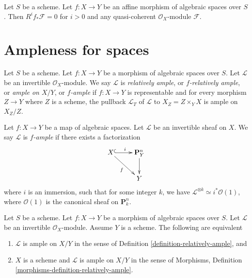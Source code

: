 \begin{lemma}
\label{lemma-affine-vanishing-higher-direct-images}
Let $S$ be a scheme. Let $f : X \to Y$ be an affine
morphism of algebraic spaces over $S$. Then
$R^if_*\mathcal{F} = 0$ for $i > 0$ and any quasi-coherent
$\mathcal{O}_X$-module $\mathcal{F}$.
\end{lemma}

\section{Ampleness for spaces}
\begin{definition}\label{definition-relatively-ample}
Let $S$ be a scheme.
Let $f : X \to Y$ be a morphism of algebraic spaces over $S$.
Let $\mathcal{L}$ be an invertible $\mathcal{O}_X$-module.
We say $\mathcal{L}$ is {\it relatively ample}, or {\it $f$-relatively ample},
or {\it ample on $X/Y$}, or {\it $f$-ample} if $f : X \to Y$
is representable and for every morphism $Z \to Y$
where $Z$ is a scheme, the pullback $\mathcal{L}_T$ of $\mathcal{L}$
to $X_Z = Z \times_Y X$ is ample on $X_Z/Z$.
\end{definition}

\begin{definition}[{\cite[II, Def.\ 7.9]{Kn}}]\label{definition-knutson-ample}
  Let $f : X \to Y$ be a map of algebraic spaces. Let $\mathcal{L}$ be an
  invertible sheaf on $X$. We say $\mathcal{L}$ is {\it $f$-ample} if there
  exists a factorization
  $$
  \xymatrix{
    X \ar@{^{(}->}[r]^i\ar[dr]_f & \mathbf{P}^n_Y \ar[d]\\
    & Y
  }
  $$
  where $i$ is an immersion, such that for some integer $k$, we have
  $\mathcal{L}^{\otimes k} \simeq i^*\mathcal{O}(1)$, where $\mathcal{O}(1)$ is
  the canonical sheaf on $\mathbf{P}^n_k$.
\end{definition}

\begin{lemma}
\label{lemma-relatively-ample-sanity-check}
Let $S$ be a scheme.
Let $f : X \to Y$ be a morphism of algebraic spaces over $S$.
Let $\mathcal{L}$ be an invertible $\mathcal{O}_X$-module.
Assume $Y$ is a scheme. The following are equivalent
\begin{enumerate}
\item $\mathcal{L}$ is ample on $X/Y$ in the sense of
Definition \ref{definition-relatively-ample}, and
\item $X$ is a scheme and $\mathcal{L}$ is ample on $X/Y$
in the sense of
Morphisms, Definition \ref{morphisms-definition-relatively-ample}.
\end{enumerate}
\end{lemma}

